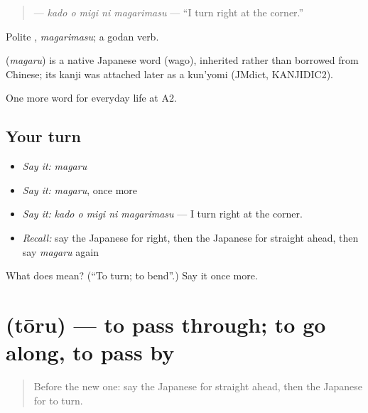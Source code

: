 \begin{quote}
\textbf{  } — \emph{kado o migi ni magarimasu} — \textquotedblleft{}I turn right at the corner.\textquotedblright{}
\end{quote}

Polite \textbf{}, \emph{magarimasu}; a godan verb.

\begin{cousinweb}
\textbf{} (\emph{magaru}) is a native Japanese word (wago), inherited rather than borrowed from Chinese; its kanji was attached later as a kun'yomi (JMdict, KANJIDIC2).
\end{cousinweb}

\begin{grammarlens}[title={What you've built}]
One more word for everyday life at A2.
\end{grammarlens}

\subsection*{Your turn}
\begin{itemize}
\raggedright
  \item \emph{Say it:} \emph{magaru}
  \item \emph{Say it:} \emph{magaru}, once more
  \item \emph{Say it:} \emph{kado o migi ni magarimasu} — I turn right at the corner.
  \item \emph{Recall:} say the Japanese for right, then the Japanese for straight ahead, then say \emph{magaru} again
\end{itemize}

\begin{tcolorbox}[breakable,colback=teal!4,colframe=teal!35!black,title={Before you move on}]
What does  mean? (\textquotedblleft{}To turn; to bend\textquotedblright{}.) Say it once more.
\end{tcolorbox}
\section[\texorpdfstring{\ja{とおる} (tōru)}{とおる (tōru)}]{ (tōru) — to pass through; to go along, to pass by}

\label{lesson:JA-C194-tooru}



\begin{quote}
Before the new one: say the Japanese for straight ahead, then the Japanese for to turn.
\end{quote}

